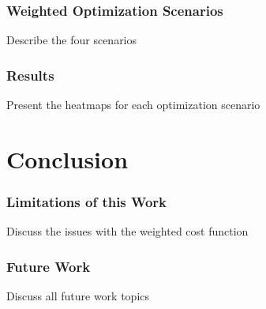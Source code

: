 \documentclass[10pt, compress, aspectratio=169]{beamer}
\begin{document}
\begin{frame}
    \frametitle{Weighted Optimization Scenarios}
    \begin{block}{Describe the four scenarios}
    \end{block}
\end{frame}

\begin{frame}
    \frametitle{Results}
    \begin{block}{Present the heatmaps for each optimization scenario}
    \end{block}
\end{frame}

\section{Conclusion}

\begin{frame}
    \frametitle{Limitations of this Work}
    \begin{block}{Discuss the issues with the weighted cost function}
    \end{block}
\end{frame}

\begin{frame}
    \frametitle{Future Work}
    \begin{block}{Discuss all future work topics}
    \end{block}
\end{frame}

\maketitle
\end{document}
